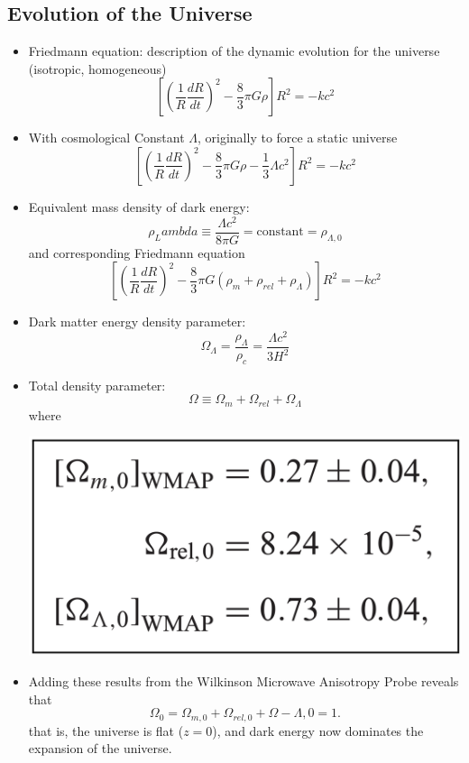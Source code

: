 \documentclass{book}
\begin{document}
\subsection{Evolution of the Universe}
\begin{itemize}
    \item Friedmann equation: description of the dynamic evolution for the universe (isotropic, homogeneous)
          \begin{equation*}
              \left[  \left( \frac{1}{R} \frac{dR}{dt} \right)^2 - \frac{8}{3} \pi G \rho \right] R^2 = - k c^2 \tag{C\&O 29.107}
          \end{equation*}
    \item With cosmological Constant $\Lambda$, originally to force a static universe
          \begin{equation*}
              \left[  \left( \frac{1}{R} \frac{dR}{dt} \right)^2 - \frac{8}{3} \pi G \rho - \frac{1}{3} \Lambda c^2 \right] R^2 = - k c^2 \tag{C\&O 29.108}
          \end{equation*}
    \item Equivalent mass density of dark energy:
          \begin{equation*}
              \rho_Lambda \equiv \frac{\Lambda c^2}{8 \pi G} = \text{constant} = \rho_{\Lambda, 0} \tag{C\&O 29.113}
          \end{equation*}
          and corresponding Friedmann equation
          \begin{equation*}
              \left[  \left( \frac{1}{R} \frac{dR}{dt} \right)^2 - \frac{8}{3} \pi G (\rho_m + \rho_{rel} + \rho_\Lambda) \right] R^2 = - k c^2 \tag{C\&O 29.114}
          \end{equation*}
    \item Dark matter energy density parameter:
          \begin{equation*}
              \Omega_\Lambda = \frac{\rho_\Lambda}{\rho_c} = \frac{\Lambda c^2}{3 H^2} \tag{C\&O 29.118}
          \end{equation*}
    \item Total density parameter:
    \begin{equation*}
        \Omega \equiv \Omega_m + \Omega_{rel} + \Omega_\Lambda
    \end{equation*}
    where
    \begin{center}
        \includegraphics[height = 0.15 \textwidth]{images/total_density.png}
    \end{center}
    \item Adding these results from the Wilkinson Microwave Anisotropy Probe reveals that $$\Omega_0 = \Omega_{m,0} + \Omega_{rel,0} + \Omega-{\Lambda,0} = 1.$$ that is, the universe is flat ($z = 0$), and dark energy now dominates the expansion of the universe.
\end{itemize}
\end{document}
